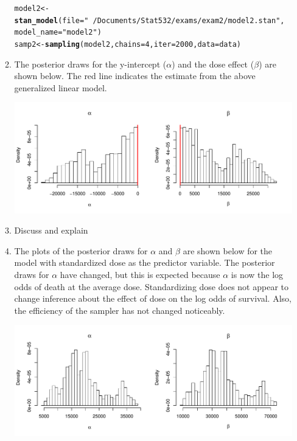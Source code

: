 \documentclass[12pt]{article}\usepackage[]{graphicx}\usepackage[]{color}
\makeatletter
\newcommand{\hlnum}[1]{\textcolor[rgb]{0.686,0.059,0.569}{#1}}%
\newcommand{\hlstr}[1]{\textcolor[rgb]{0.192,0.494,0.8}{#1}}%
\newcommand{\hlstd}[1]{\textcolor[rgb]{0.345,0.345,0.345}{#1}}%
\newcommand{\hlkwb}[1]{\textcolor[rgb]{0.69,0.353,0.396}{#1}}%
\newcommand{\hlkwc}[1]{\textcolor[rgb]{0.333,0.667,0.333}{#1}}%
\newcommand{\hlkwd}[1]{\textcolor[rgb]{0.737,0.353,0.396}{\textbf{#1}}}%
\newenvironment{kframe}{%
 \def\at@end@of@kframe{}%
 \ifinner\ifhmode%
  \def\at@end@of@kframe{\end{minipage}}%
  \begin{minipage}{\columnwidth}%
 \fi\fi%
 \def\FrameCommand##1{\hskip\@totalleftmargin \hskip-\fboxsep
 \colorbox{shadecolor}{##1}\hskip-\fboxsep
     \hskip-\linewidth \hskip-\@totalleftmargin \hskip\columnwidth}%
 \MakeFramed {\advance\hsize-\width
   \@totalleftmargin\z@ \linewidth\hsize
   \@setminipage}}%
 {\par\unskip\endMakeFramed%
 \at@end@of@kframe}
\newenvironment{knitrout}{}{} %
\makeatother
\begin{document}
\begin{enumerate}
\begin{enumerate}
\begin{knitrout}
\begin{kframe}
\begin{alltt}
\hlstd{model2} \hlkwb{<-} \hlkwd{stan_model}\hlstd{(}\hlkwc{file} \hlstd{=} \hlstr{"~/Documents/Stat532/exams/exam2/model2.stan"}\hlstd{,}
                     \hlkwc{model_name} \hlstd{=} \hlstr{"model2"}\hlstd{)}
\hlstd{samp2} \hlkwb{<-} \hlkwd{sampling}\hlstd{(model2,} \hlkwc{chains} \hlstd{=} \hlnum{4}\hlstd{,} \hlkwc{iter} \hlstd{=} \hlnum{2000}\hlstd{,} \hlkwc{data} \hlstd{= data)}
\end{alltt}
\end{kframe}
\end{knitrout}

\item The posterior draws for the y-intercept ($\alpha$) and the dose effect ($\beta$) are shown below. The red line indicates the estimate from the above generalized linear model.

\begin{knitrout}\footnotesize
{}\color{fgcolor}
\includegraphics[width=\linewidth]{figure/compare-1} 

\end{knitrout}

\item Discuss and explain

\item The plots of the posterior draws for $\alpha$ and $\beta$ are shown below for the model with standardized dose as the predictor variable. The posterior draws for $\alpha$ have changed, but this is expected because $\alpha$ is now the log odds of death at the average dose. Standardizing dose does not appear to change inference about the effect of dose on the log odds of survival. Also, the efficiency of the sampler has not changed noticeably.



\begin{knitrout}\footnotesize
{}\color{fgcolor}
\includegraphics[width=\linewidth]{figure/stdcompare-1} 


\end{knitrout}
\end{enumerate}
\end{enumerate}
\end{document}
